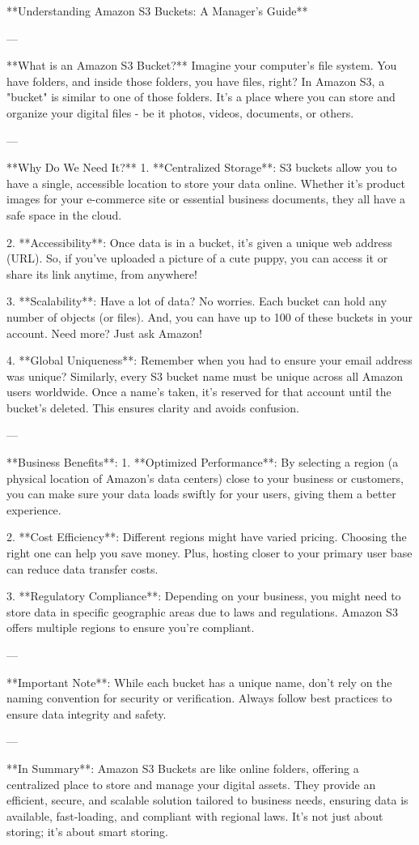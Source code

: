**Understanding Amazon S3 Buckets: A Manager's Guide**

---

**What is an Amazon S3 Bucket?**
Imagine your computer's file system. You have folders, and inside those folders, you have files, right? In Amazon S3, a "bucket" is similar to one of those folders. It's a place where you can store and organize your digital files - be it photos, videos, documents, or others.

---

**Why Do We Need It?**
1. **Centralized Storage**: S3 buckets allow you to have a single, accessible location to store your data online. Whether it's product images for your e-commerce site or essential business documents, they all have a safe space in the cloud.
   
2. **Accessibility**: Once data is in a bucket, it's given a unique web address (URL). So, if you've uploaded a picture of a cute puppy, you can access it or share its link anytime, from anywhere!

3. **Scalability**: Have a lot of data? No worries. Each bucket can hold any number of objects (or files). And, you can have up to 100 of these buckets in your account. Need more? Just ask Amazon!

4. **Global Uniqueness**: Remember when you had to ensure your email address was unique? Similarly, every S3 bucket name must be unique across all Amazon users worldwide. Once a name's taken, it's reserved for that account until the bucket's deleted. This ensures clarity and avoids confusion.

---

**Business Benefits**:
1. **Optimized Performance**: By selecting a region (a physical location of Amazon's data centers) close to your business or customers, you can make sure your data loads swiftly for your users, giving them a better experience.

2. **Cost Efficiency**: Different regions might have varied pricing. Choosing the right one can help you save money. Plus, hosting closer to your primary user base can reduce data transfer costs.

3. **Regulatory Compliance**: Depending on your business, you might need to store data in specific geographic areas due to laws and regulations. Amazon S3 offers multiple regions to ensure you're compliant.

---

**Important Note**:
While each bucket has a unique name, don't rely on the naming convention for security or verification. Always follow best practices to ensure data integrity and safety.

---

**In Summary**:
Amazon S3 Buckets are like online folders, offering a centralized place to store and manage your digital assets. They provide an efficient, secure, and scalable solution tailored to business needs, ensuring data is available, fast-loading, and compliant with regional laws. It's not just about storing; it's about smart storing.